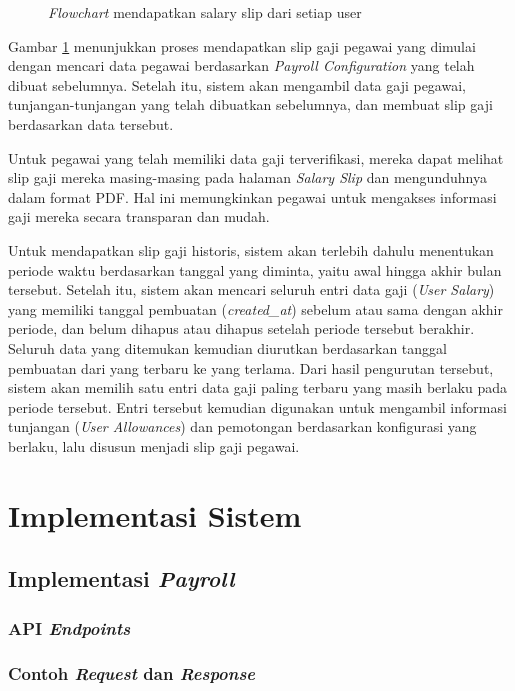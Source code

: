 \begin{figure}[H]
    \caption{\textit{Flowchart} mendapatkan salary slip dari setiap user}
    \label{fig:mendapatkan_salary_slip_dari_setiap_user}
\end{figure}

Gambar \ref{fig:mendapatkan_salary_slip_dari_setiap_user} menunjukkan proses mendapatkan slip gaji pegawai yang dimulai dengan mencari data pegawai berdasarkan \textit{Payroll Configuration} yang telah dibuat sebelumnya. Setelah itu, sistem akan mengambil data gaji pegawai, tunjangan-tunjangan yang telah dibuatkan sebelumnya, dan membuat slip gaji berdasarkan data tersebut. 

Untuk pegawai yang telah memiliki data gaji terverifikasi, mereka dapat melihat slip gaji mereka masing-masing pada halaman \textit{Salary Slip} dan mengunduhnya dalam format PDF. Hal ini memungkinkan pegawai untuk mengakses informasi gaji mereka secara transparan dan mudah.

Untuk mendapatkan slip gaji historis, sistem akan terlebih dahulu menentukan periode waktu berdasarkan tanggal yang diminta, yaitu awal hingga akhir bulan tersebut. Setelah itu, sistem akan mencari seluruh entri data gaji (\textit{User Salary}) yang memiliki tanggal pembuatan (\textit{created\_at}) sebelum atau sama dengan akhir periode, dan belum dihapus atau dihapus setelah periode tersebut berakhir. Seluruh data yang ditemukan kemudian diurutkan berdasarkan tanggal pembuatan dari yang terbaru ke yang terlama. Dari hasil pengurutan tersebut, sistem akan memilih satu entri data gaji paling terbaru yang masih berlaku pada periode tersebut. Entri tersebut kemudian digunakan untuk mengambil informasi tunjangan (\textit{User Allowances}) dan pemotongan berdasarkan konfigurasi yang berlaku, lalu disusun menjadi slip gaji pegawai.

\section{Implementasi Sistem}
\subsection{Implementasi \textit{Payroll}}
\subsubsection{API \textit{Endpoints}}
\subsubsection{Contoh \textit{Request} dan \textit{Response}}

